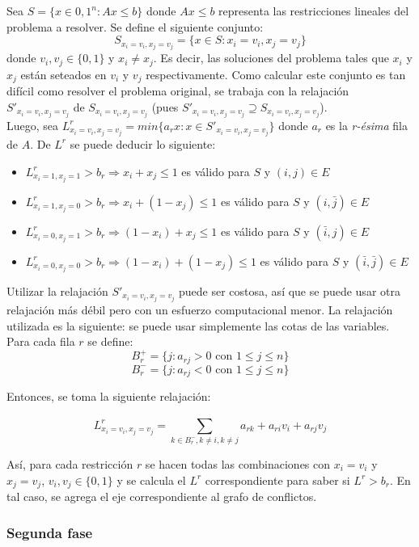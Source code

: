 Sea $S = \{x\in {0,1}^n : Ax \leq b\}$ donde $Ax \leq b$ representa las restricciones lineales del problema a resolver. Se define el siguiente conjunto: 
$$S_{x_i=v_i,x_j=v_j} = \{x\in S : x_i = v_i, x_j = v_j\}$$ 
donde $v_i,v_j\in \{0,1\}$ y $x_i \neq x_j$. Es decir, las soluciones del problema tales que $x_i$ y $x_j$ est\'an seteados en $v_i$ y $v_j$ respectivamente. Como calcular este conjunto es tan dif\'icil como resolver el problema original, se trabaja con la relajaci\'on $S'_{x_i=v_i,x_j=v_j}$ de $S_{x_i=v_i,x_j=v_j}$ (pues $S'_{x_i=v_i,x_j=v_j} \supseteq S_{x_i=v_i,x_j=v_j}$). \\
Luego, sea $L^r_{x_i=v_i,x_j=v_j} = min\{a_rx : x\in S'_{x_i=v_i,x_j=v_j}\}$ donde $a_r$ es la \textit{r-\'esima} fila de $A$. De $L^r$ se puede deducir lo siguiente:
\begin{itemize}
\item $L^r_{x_i=1,x_j=1} > b_r \Longrightarrow x_i + x_j \leq 1$ es v\'alido para $S$ y $(i,j)\in E$
\item $L^r_{x_i=1,x_j=0} > b_r \Longrightarrow x_i + (1-x_j) \leq 1$ es v\'alido para $S$ y $(i,\bar{j})\in E$ 
\item $L^r_{x_i=0,x_j=1} > b_r \Longrightarrow (1-x_i) + x_j \leq 1$ es v\'alido para $S$ y $(\bar{i},j)\in E$ 
\item $L^r_{x_i=0,x_j=0} > b_r \Longrightarrow (1-x_i) + (1-x_j) \leq 1$ es v\'alido para $S$ y $(\bar{i},\bar{j})\in E$
\end{itemize}

Utilizar la relajaci\'on $S'_{x_i=v_i,x_j=v_j}$ puede ser costosa, as\'i que se puede usar otra relajaci\'on m\'as d\'ebil pero con un esfuerzo computacional menor. La relajaci\'on utilizada es la siguiente: se puede usar simplemente las cotas de las variables. Para cada fila $r$ se define: \\ 
$$B^+_r = \{j: a_{rj} > 0 \text{ con } 1\leq j \leq n\}$$
$$B^-_r = \{j: a_{rj} < 0 \text{ con } 1\leq j \leq n\}$$

Entonces, se toma la siguiente relajaci\'on: 

$$L^r_{x_i=v_i,x_j=v_j} = \overset{}{\underset{k\in B^-_r,k\neq i,k\neq j}{\sum}} a_{rk} + a_{ri}v_i + a_{rj}v_j$$

As\'i, para cada restricci\'on $r$ se hacen todas las combinaciones con $x_i = v_i$ y $x_j = v_j$, $v_i,v_j\in \{0,1\}$ y se calcula el $L^r$ correspondiente para saber si $L^r > b_r$. En tal caso, se agrega el eje correspondiente al grafo de conflictos.

\subsubsection*{Segunda fase}

